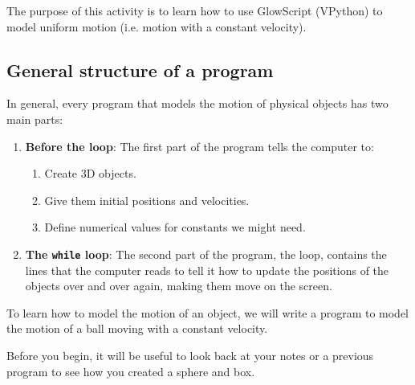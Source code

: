 
\apparatus
{}

\longgoal

The purpose of this activity is to learn how to use GlowScript (VPython) to model uniform motion (i.e. motion with a constant velocity).

\introduction

\subsection*{General structure of a program}

In general, every program that models the motion of physical objects has two main parts:

\begin{enumerate}
	\item {\bf Before the loop}:  The first part of the program tells the computer to:
	\begin{enumerate}
		\item Create 3D objects.
		\item Give them initial positions and velocities.
		\item Define numerical values for constants we might need.
	\end{enumerate}
	\item {\bf The \texttt{while} loop}:  The second part of the program, the loop, contains the lines that the computer reads to tell it how to update the positions of the objects over and over again, making them move on the screen. \end{enumerate}

To learn how to model the motion of an object, we will write a program to model the motion of a ball moving with a constant velocity.

\procedure

Before you begin, it will be useful to look back at your notes or a previous program to see how you created a sphere and box.

